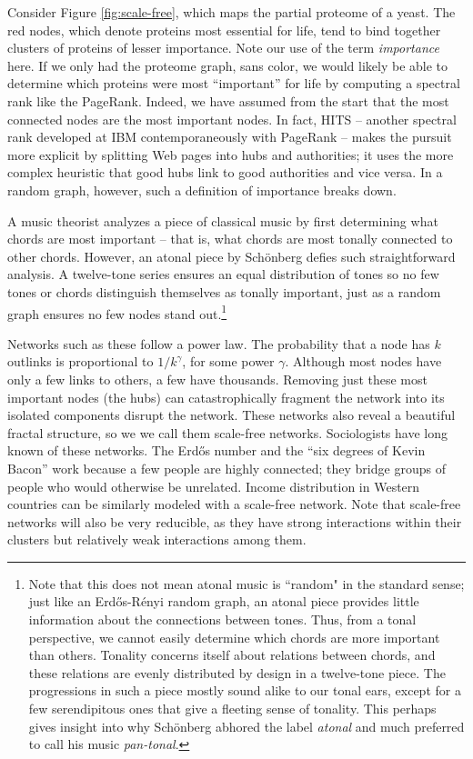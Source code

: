 \documentclass[12pt]{article}
\begin{document}
Consider Figure \ref{fig:scale-free}, which maps the partial proteome of a
yeast. The red nodes, which denote proteins most essential for life, tend to
bind together clusters of proteins of lesser importance. Note our use of the
term \textit{importance} here. If we only had the proteome graph, sans color, we
would likely be able to determine which proteins were most ``important'' for
life by computing a spectral rank like the PageRank. Indeed, we have assumed
from the start that the most connected nodes are the most important nodes. In
fact, HITS -- another spectral rank developed at IBM contemporaneously with
PageRank -- makes the pursuit more explicit by splitting Web pages into hubs and
authorities; it uses the more complex heuristic that good hubs link to good
authorities and vice versa. In a random graph, however, such a definition of
importance breaks down.

A music theorist analyzes a piece of classical music by first determining what
chords are most important -- that is, what chords are most tonally connected to
other chords. However, an atonal piece by Schönberg defies such straightforward
analysis. A twelve-tone series ensures an equal distribution of tones so no few
tones or chords distinguish themselves as tonally important, just as a random
graph ensures no few nodes stand out.\footnote{Note that this does not mean
  atonal music is ``random" in the standard sense; just like an Erdős-Rényi
  random graph, an atonal piece provides little information about the
  connections between tones. Thus, from a tonal perspective, we cannot easily
  determine which chords are more important than others. Tonality concerns
  itself about relations between chords, and these relations are evenly
  distributed by design in a twelve-tone piece. The progressions in such a piece
  mostly sound alike to our tonal ears, except for a few serendipitous ones that
  give a fleeting sense of tonality. This perhaps gives
  insight into why Schönberg abhored the label \textit{atonal} and much
  preferred to call his music \textit{pan-tonal}.}

Networks such as these follow a power law. The probability that a node has $k$
outlinks is proportional to $1/k^\gamma$, for some power $\gamma$. Although most
nodes have only a few links to others, a few have thousands. Removing just these
most important nodes (the hubs) can catastrophically fragment the network into
its isolated components disrupt the network. These networks also reveal a
beautiful fractal structure, so we we call them scale-free networks.
Sociologists have long known of these networks. The Erdős number and the ``six
degrees of Kevin Bacon'' work because a few people are highly connected; they
bridge groups of people who would otherwise be unrelated. Income distribution in
Western countries can be similarly modeled with a scale-free network. Note that
scale-free networks will also be very reducible, as they have strong
interactions within their clusters but relatively weak interactions among them.
\end{document}
